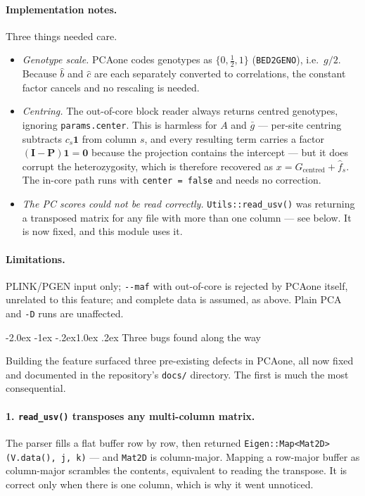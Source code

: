 \documentclass[10pt,a4paper]{article}
\makeatletter
\renewcommand\subsection{\@startsection{subsection}{2}{\z@}%
  {-2.0ex \@plus -1ex \@minus -.2ex}{1.0ex \@plus.2ex}%
  {\normalfont\normalsize\bfseries\color{hdr}}}
\newenvironment{tightitem}{%
  \begin{itemize}\setlength{\itemsep}{1pt}\setlength{\parskip}{0pt}%
  \setlength{\topsep}{3pt}\setlength{\parsep}{0pt}}{\end{itemize}}
\makeatother
\begin{document}
\paragraph{Implementation notes.} Three things needed care.
\begin{tightitem}
  \item \emph{Genotype scale.} PCAone codes genotypes as $\{0,\tfrac12,1\}$ (\texttt{BED2GENO}), i.e.\ $g/2$.
  Because $\hat b$ and $\hat c$ are each separately converted to correlations, the constant factor cancels
  and no rescaling is needed.
  \item \emph{Centring.} The out-of-core block reader always returns centred genotypes, ignoring
  \texttt{params.center}. This is harmless for $A$ and $\bar g$ --- per-site centring subtracts $c_s\mathbf 1$
  from column $s$, and every resulting term carries a factor $(\mathbf I-\mathbf P)\mathbf 1=\mathbf 0$
  because the projection contains the intercept --- but it does corrupt the heterozygosity, which is
  therefore recovered as $x = G_{\text{centred}} + \hat f_s$. The in-core path runs with
  \texttt{center = false} and needs no correction.
  \item \emph{The PC scores could not be read correctly.} \texttt{Utils::read\_usv()} was returning a
  transposed matrix for any file with more than one column --- see below. It is now fixed, and this module
  uses it.
\end{tightitem}

\paragraph{Limitations.} PLINK/PGEN input only; \texttt{-{}-maf} with out-of-core is rejected by PCAone
itself, unrelated to this feature; and complete data is assumed, as above. Plain PCA and \texttt{-D} runs are
unaffected.

\subsection{Three bugs found along the way}

Building the feature surfaced three pre-existing defects in PCAone, all now fixed and documented in the
repository's \texttt{docs/} directory. The first is much the most consequential.

\paragraph{1. \texttt{read\_usv()} transposes any multi-column matrix.} The parser fills a flat buffer row by
row, then returned \texttt{Eigen::Map<Mat2D>(V.data(), j, k)} --- and \texttt{Mat2D} is column-major. Mapping
a row-major buffer as column-major scrambles the contents, equivalent to reading the transpose. It is correct
only when there is one column, which is why it went unnoticed.
\end{document}
